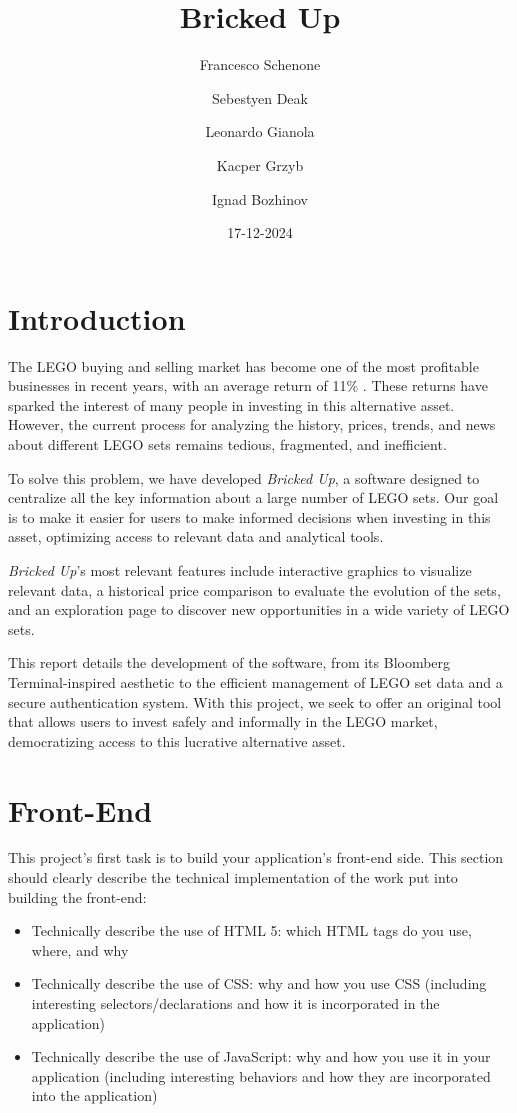 \documentclass[letterpaper,twocolumn]{article}
\title{Bricked Up}
\author{Francesco Schenone \and Sebestyen Deak \and Leonardo Gianola \and Kacper Grzyb \and Ignad Bozhinov}
\date{17-12-2024}
\begin{document}
\maketitle

\section{Introduction}

The LEGO buying and selling market has become one of the most profitable businesses in recent years, with an average return of 11\% \cite{lego_market}. These returns have sparked the interest of many people in investing in this alternative asset. However, the current process for analyzing the history, prices, trends, and news about different LEGO sets remains tedious, fragmented, and inefficient.

To solve this problem, we have developed \textit{Bricked Up}, a software designed to centralize all the key information about a large number of LEGO sets. Our goal is to make it easier for users to make informed decisions when investing in this asset, optimizing access to relevant data and analytical tools.

\textit{Bricked Up}'s most relevant features include interactive graphics to visualize relevant data, a historical price comparison to evaluate the evolution of the sets, and an exploration page to discover new opportunities in a wide variety of LEGO sets.

This report details the development of the software, from its Bloomberg Terminal-inspired aesthetic to the efficient management of LEGO set data and a secure authentication system. With this project, we seek to offer an original tool that allows users to invest safely and informally in the LEGO market, democratizing access to this lucrative alternative asset.

\section{Front-End}

This project's first task is to build your application's front-end side.
This section should clearly describe the technical implementation of the work put into building the front-end:

\begin{itemize}
    \item Technically describe the use of HTML 5: which HTML tags do you use, where, and why
    \item Technically describe the use of CSS: why and how you use CSS (including interesting selectors/declarations and how it is incorporated in the application)
    \item Technically describe the use of JavaScript: why and how you use it in your application (including interesting behaviors and how they are incorporated into the application)
\end{itemize}
\end{document}
